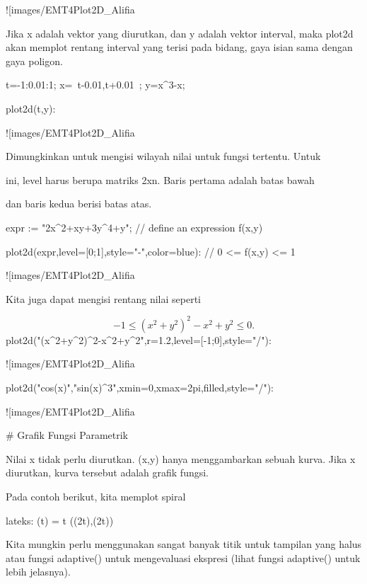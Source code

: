 \documentclass{article}
\begin{document}
![images/EMT4Plot2D_Alifia%

Jika x adalah vektor yang diurutkan, dan y adalah vektor interval,
maka plot2d akan memplot rentang interval yang terisi pada bidang,
gaya isian sama dengan gaya poligon.


\>t=-1:0.01:1; x=~t-0.01,t+0.01~; y=x^3-x;

\>plot2d(t,y):


![images/EMT4Plot2D_Alifia%

Dimungkinkan untuk mengisi wilayah nilai untuk fungsi tertentu. Untuk


ini, level harus berupa matriks 2xn. Baris pertama adalah batas bawah


dan baris kedua berisi batas atas.


\>expr := "2\*x^2+x\*y+3\*y^4+y"; // define an expression f(x,y)

\>plot2d(expr,level=[0;1],style="-",color=blue): // 0 <= f(x,y) <= 1


![images/EMT4Plot2D_Alifia%

Kita juga dapat mengisi rentang nilai seperti


$$-1 \le (x^2+y^2)^2-x^2+y^2 \le 0.$$\>plot2d("(x^2+y^2)^2-x^2+y^2",r=1.2,level=[-1;0],style="/"):


![images/EMT4Plot2D_Alifia%

\>plot2d("cos(x)","sin(x)^3",xmin=0,xmax=2pi,\>filled,style="/"):


![images/EMT4Plot2D_Alifia%

# Grafik Fungsi Parametrik

Nilai x tidak perlu diurutkan. (x,y) hanya menggambarkan sebuah kurva.
Jika x diurutkan, kurva tersebut adalah grafik fungsi.


Pada contoh berikut, kita memplot spiral


lateks: \gamma(t) = t \cdot (\cos(2\pi t),\sin(2\pi t))


Kita mungkin perlu menggunakan sangat banyak titik untuk tampilan yang
halus atau fungsi adaptive() untuk mengevaluasi ekspresi (lihat fungsi
adaptive() untuk lebih jelasnya).
\end{document}
